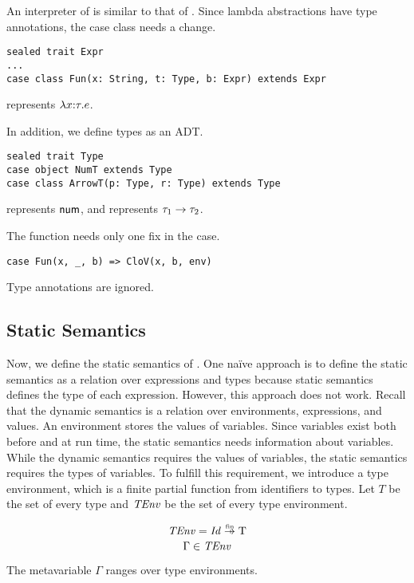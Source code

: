 An interpreter of \lang is similar to that of \plang. Since lambda abstractions
have type annotations, the  case class needs a change.

\begin{verbatim}
sealed trait Expr
...
case class Fun(x: String, t: Type, b: Expr) extends Expr
\end{verbatim}

 represents $\lambda x{:}\tau.e$.

In addition, we define types as an ADT.

\begin{verbatim}
sealed trait Type
case object NumT extends Type
case class ArrowT(p: Type, r: Type) extends Type
\end{verbatim}

 represents $\textsf{num}$, and  represents
$\tau_1\rightarrow\tau_2$.

The  function needs only one fix in the  case.

\begin{verbatim}
case Fun(x, _, b) => CloV(x, b, env)
\end{verbatim}

Type annotations are ignored.

\subsection{Static Semantics}

Now, we define the static semantics of \lang. One naïve approach is to define
the static semantics as a relation over expressions and types because static
semantics defines the type of each expression. However, this approach does not
work. Recall that the dynamic semantics is a
relation over environments, expressions, and values. An environment stores the
values of variables. Since variables exist both before and at run time, the static
semantics needs information about variables. While the dynamic semantics requires the
values of variables, the static semantics requires the types of variables.
To fulfill this requirement,
we introduce a type environment, which is a finite partial function from identifiers to types.
Let $T$ be the set of every type and $\mbox{\emph{TEnv}}$ be the set of every type
environment.

\[ \embox{TEnv} = \embox{Id}\finto\text{T} \]
\[ \Gamma \in \mbox{\emph{TEnv}} \]

The metavariable $\Gamma$ ranges over type environments.

